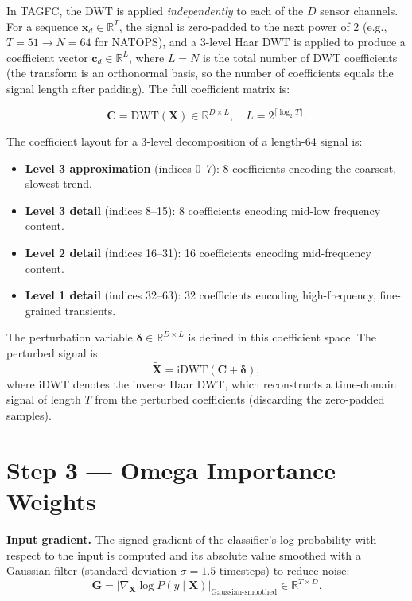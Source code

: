 In TAGFC, the DWT is applied \emph{independently} to each of the $D$ sensor channels. For a sequence $\mathbf{x}_d \in \mathbb{R}^T$, the signal is zero-padded to the next power of 2 (e.g., $T = 51 \rightarrow N = 64$ for NATOPS), and a 3-level Haar DWT is applied to produce a coefficient vector $\mathbf{c}_d \in \mathbb{R}^L$, where $L = N$ is the total number of DWT coefficients (the transform is an orthonormal basis, so the number of coefficients equals the signal length after padding). The full coefficient matrix is:

\begin{equation}
    \mathbf{C} = \text{DWT}(\mathbf{X}) \in \mathbb{R}^{D \times L}, \quad L = 2^{\lceil \log_2 T \rceil}.
\end{equation}

The coefficient layout for a 3-level decomposition of a length-64 signal is:
\begin{itemize}
    \item \textbf{Level 3 approximation} (indices 0–7): 8 coefficients encoding the coarsest, slowest trend.
    \item \textbf{Level 3 detail} (indices 8–15): 8 coefficients encoding mid-low frequency content.
    \item \textbf{Level 2 detail} (indices 16–31): 16 coefficients encoding mid-frequency content.
    \item \textbf{Level 1 detail} (indices 32–63): 32 coefficients encoding high-frequency, fine-grained transients.
\end{itemize}

The perturbation variable $\boldsymbol{\delta} \in \mathbb{R}^{D \times L}$ is defined in this coefficient space. The perturbed signal is:
\begin{equation}
    \widetilde{\mathbf{X}} = \text{iDWT}(\mathbf{C} + \boldsymbol{\delta}),
\end{equation}
where iDWT denotes the inverse Haar DWT, which reconstructs a time-domain signal of length $T$ from the perturbed coefficients (discarding the zero-padded samples).

\section{Step 3 — Omega Importance Weights}

\textbf{Input gradient.} The signed gradient of the classifier's log-probability with respect to the input is computed and its absolute value smoothed with a Gaussian filter (standard deviation $\sigma = 1.5$ timesteps) to reduce noise:
\begin{equation}
    \mathbf{G} = \left| \nabla_{\mathbf{X}} \log P(y \mid \mathbf{X}) \right|_{\text{Gaussian-smoothed}} \in \mathbb{R}^{T \times D}.
\end{equation}

